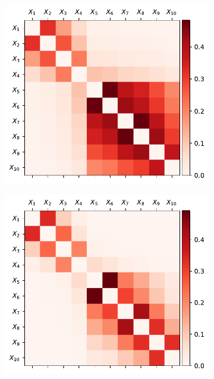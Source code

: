 \documentclass[../Thesis.tex]{subfiles}
\begin{document}
\begin{figure}[h]
    \centering
    \begin{subfigure}[t]{0.49\textwidth}
        \centering
        \includegraphics[width=\linewidth]{figures/Gaussian Chain Theoretical/symmetric G obs.pdf}
        \caption{}
    \end{subfigure}
    \hfill
    \begin{subfigure}[t]{0.49\textwidth}
        \centering
        \includegraphics[width=\linewidth]{figures/Gaussian Chain Theoretical/G dir from symmetric G obs.pdf}

\end{subfigure}
\end{figure}
\end{document}
